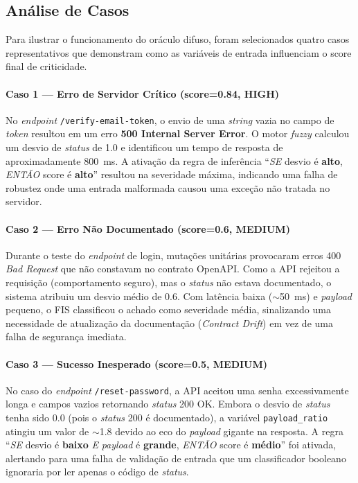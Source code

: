 \subsection{Análise de Casos}

Para ilustrar o funcionamento do oráculo difuso, foram selecionados quatro casos representativos que demonstram como as variáveis de entrada influenciam o score final de criticidade.

\paragraph{Caso 1 — Erro de Servidor Crítico (score=0.84, HIGH)}
No \textit{endpoint} \texttt{/verify-email-token}, o envio de uma \textit{string} vazia no campo de \textit{token} resultou em um erro \textbf{500 Internal Server Error}. O motor \textit{fuzzy} calculou um desvio de \textit{status} de 1.0 e identificou um tempo de resposta de aproximadamente 800~ms. A ativação da regra de inferência ``\textit{SE} desvio é \textbf{alto}, \textit{ENTÃO} score é \textbf{alto}'' resultou na severidade máxima, indicando uma falha de robustez onde uma entrada malformada causou uma exceção não tratada no servidor.

\paragraph{Caso 2 — Erro Não Documentado (score=0.6, MEDIUM)}
Durante o teste do \textit{endpoint} de login, mutações unitárias provocaram erros 400 \textit{Bad Request} que não constavam no contrato OpenAPI. Como a API rejeitou a requisição (comportamento seguro), mas o \textit{status} não estava documentado, o sistema atribuiu um desvio médio de 0.6. Com latência baixa ($\sim$50~ms) e \textit{payload} pequeno, o FIS classificou o achado como severidade média, sinalizando uma necessidade de atualização da documentação (\textit{Contract Drift}) em vez de uma falha de segurança imediata.

\paragraph{Caso 3 — Sucesso Inesperado (score=0.5, MEDIUM)}
No caso do \textit{endpoint} \texttt{/reset-password}, a API aceitou uma senha excessivamente longa e campos vazios retornando \textit{status} 200 OK. Embora o desvio de \textit{status} tenha sido 0.0 (pois o \textit{status} 200 é documentado), a variável \texttt{payload\_ratio} atingiu um valor de $\sim$1.8 devido ao eco do \textit{payload} gigante na resposta. A regra ``\textit{SE} desvio é \textbf{baixo} \textit{E} \textit{payload} é \textbf{grande}, \textit{ENTÃO} score é \textbf{médio}'' foi ativada, alertando para uma falha de validação de entrada que um classificador booleano ignoraria por ler apenas o código de \textit{status}.


